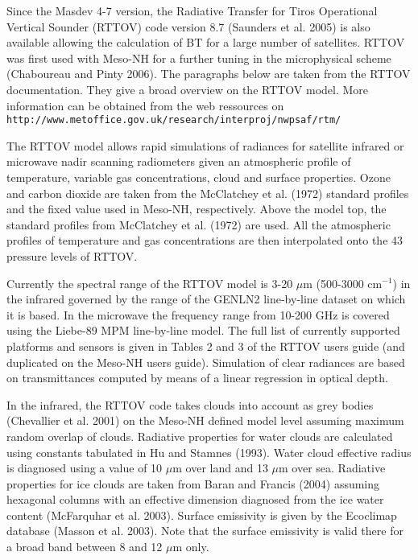 Since the Masdev 4-7 version, the Radiative Transfer for Tiros Operational Vertical Sounder (RTTOV) code version 8.7 (Saunders et al. 2005) is also available
allowing the calculation of BT for a large number of satellites. RTTOV was first used with Meso-NH for a further tuning in the microphysical scheme (Chaboureau and Pinty 2006). The paragraphs below are taken from the RTTOV documentation. They give a broad overview on the RTTOV model. More information can be obtained from the web ressources on {\tt http://www.metoffice.gov.uk/research/interproj/nwpsaf/rtm/ }

The RTTOV model allows rapid simulations of radiances for satellite infrared or
microwave nadir scanning radiometers given an atmospheric profile of
temperature, variable gas concentrations, cloud and surface properties.
Ozone and carbon dioxide are taken from the McClatchey et al. (1972) standard
profiles and the fixed value used in Meso-NH, respectively. Above the model
top, the standard profiles from McClatchey et al. (1972) are used.
All the atmospheric profiles of temperature and gas concentrations are then
interpolated onto the 43 pressure levels of RTTOV.

Currently the spectral range of the RTTOV model is 3-20 $\mu$m (500-3000
cm$^{-1}$)  in the infrared governed by the range of the GENLN2
line-by-line dataset on which it is based.
In the microwave the frequency range from 10-200 GHz is covered using
the Liebe-89 MPM line-by-line model. The full list of currently
supported platforms and sensors is given in Tables 2 and 3 of
the RTTOV users guide (and duplicated on the Meso-NH users guide).
Simulation of clear radiances are based on transmittances computed by means
of a linear regression in optical depth.

In the infrared, the RTTOV code takes clouds into account as grey bodies
(Chevallier et al. 2001) on the Meso-NH defined model level assuming
maximum random overlap of clouds. Radiative properties for water clouds
are calculated using constants tabulated in Hu and Stamnes (1993).
Water cloud effective radius is diagnosed using a value of 10 $\mu$m
over land and 13 $\mu$m over sea.
Radiative properties for ice clouds are taken from Baran and Francis (2004)
assuming hexagonal columns with an effective dimension diagnosed
from the ice water content (McFarquhar et al. 2003).
Surface emissivity is given by the Ecoclimap database (Masson et al. 2003).
Note that the surface emissivity is valid there for a broad band
between 8 and 12 $\mu$m only.

